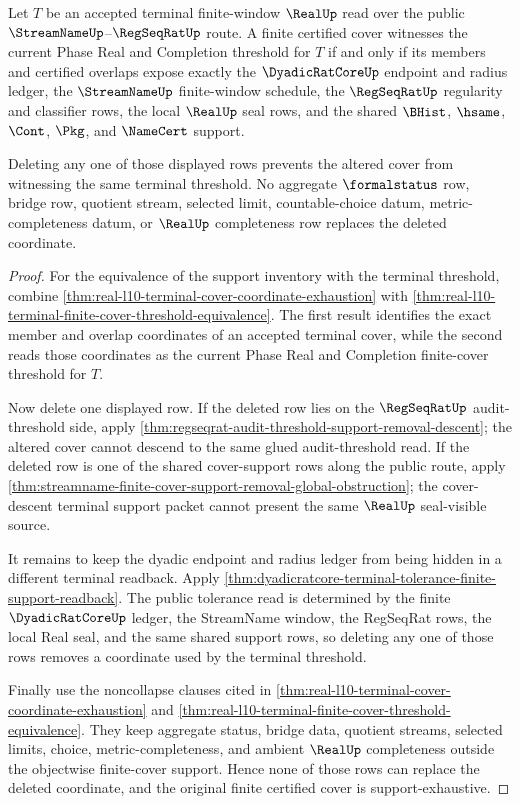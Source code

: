 \begin{theorem}
\label{thm:real-l10-finite-cover-terminal-support-exhaustion}
Let $T$ be an accepted terminal finite-window $\RealUp$ read over the public
$\StreamNameUp$--$\RegSeqRatUp$ route. A finite certified cover witnesses the
current Phase Real and Completion threshold for $T$ if and only if its members
and certified overlaps expose exactly the $\DyadicRatCoreUp$ endpoint and
radius ledger, the $\StreamNameUp$ finite-window schedule, the
$\RegSeqRatUp$ regularity and classifier rows, the local $\RealUp$ seal rows,
and the shared $\BHist$, $\hsame$, $\Cont$, $\Pkg$, and $\NameCert$ support.

Deleting any one of those displayed rows prevents the altered cover from
witnessing the same terminal threshold. No aggregate $\formalstatus$ row,
bridge row, quotient stream, selected limit, countable-choice datum,
metric-completeness datum, or $\RealUp$ completeness row replaces the deleted
coordinate.
\end{theorem}
\begin{proof}
For the equivalence of the support inventory with the terminal threshold,
combine \autoref{thm:real-l10-terminal-cover-coordinate-exhaustion} with
\autoref{thm:real-l10-terminal-finite-cover-threshold-equivalence}. The first
result identifies the exact member and overlap coordinates of an accepted
terminal cover, while the second reads those coordinates as the current Phase
Real and Completion finite-cover threshold for $T$.

Now delete one displayed row. If the deleted row lies on the
$\RegSeqRatUp$ audit-threshold side, apply
\autoref{thm:regseqrat-audit-threshold-support-removal-descent}; the altered
cover cannot descend to the same glued audit-threshold read. If the deleted row
is one of the shared cover-support rows along the public route, apply
\autoref{thm:streamname-finite-cover-support-removal-global-obstruction}; the
cover-descent terminal support packet cannot present the same
$\RealUp$ seal-visible source.

It remains to keep the dyadic endpoint and radius ledger from being hidden in a
different terminal readback. Apply
\autoref{thm:dyadicratcore-terminal-tolerance-finite-support-readback}. The
public tolerance read is determined by the finite $\DyadicRatCoreUp$ ledger,
the StreamName window, the RegSeqRat rows, the local Real seal, and the same
shared support rows, so deleting any one of those rows removes a coordinate
used by the terminal threshold.

Finally use the noncollapse clauses cited in
\autoref{thm:real-l10-terminal-cover-coordinate-exhaustion} and
\autoref{thm:real-l10-terminal-finite-cover-threshold-equivalence}. They keep
aggregate status, bridge data, quotient streams, selected limits, choice,
metric-completeness, and ambient $\RealUp$ completeness outside the objectwise
finite-cover support. Hence none of those rows can replace the deleted
coordinate, and the original finite certified cover is support-exhaustive.
\end{proof}

